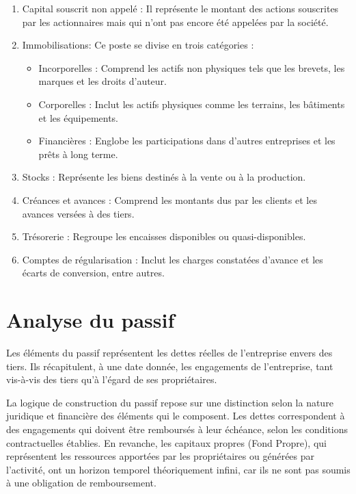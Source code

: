 \documentclass[a4paper, 12pt]{report}
\begin{document}
\begin{enumerate}
	\item Capital souscrit non appelé : Il représente le montant des actions souscrites par les actionnaires mais qui n'ont pas encore été appelées par la société.
	\item Immobilisations: Ce poste se divise en trois catégories :
\begin{itemize}
	\item  Incorporelles : Comprend les actifs non physiques tels que les brevets, les marques et les droits d'auteur.
	\item  Corporelles : Inclut les actifs physiques comme les terrains, les bâtiments et les équipements.	
	\item Financières : Englobe les participations dans d'autres entreprises et les prêts à long terme.
\end{itemize}
	\item Stocks : Représente les biens destinés à la vente ou à la production.
	\item Créances et avances : Comprend les montants dus par les clients et les avances versées à des tiers.
	\item Trésorerie : Regroupe les encaisses disponibles ou quasi-disponibles.
	\item Comptes de régularisation : Inclut les charges constatées d'avance et les écarts de conversion, entre autres.
\end{enumerate}

\section{Analyse du passif}

Les éléments du passif représentent les dettes réelles de l'entreprise envers des tiers. Ils récapitulent, à une date donnée, les engagements de l'entreprise, tant vis-à-vis des tiers qu'à l'égard de ses propriétaires. 

La logique de construction du passif repose sur une distinction selon la nature juridique et financière des éléments qui le composent. Les dettes correspondent à des engagements qui doivent être remboursés à leur échéance, selon les conditions contractuelles établies. En revanche, les capitaux propres (Fond Propre), qui représentent les ressources apportées par les propriétaires ou générées par l'activité, ont un horizon temporel théoriquement infini, car ils ne sont pas soumis à une obligation de remboursement.
\end{document}
